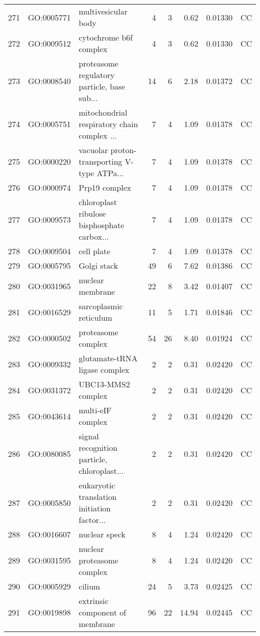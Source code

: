 \documentclass[12pt,oneside,a4paper]{article}
\begin{document}
\begin{longtable}{rllrrrll}
  271 & GO:0005771 & multivesicular body &   4 &   3 & 0.62 & 0.01330 & CC \\ 
  272 & GO:0009512 & cytochrome b6f complex &   4 &   3 & 0.62 & 0.01330 & CC \\ 
  273 & GO:0008540 & proteasome regulatory particle, base sub... &  14 &   6 & 2.18 & 0.01372 & CC \\ 
  274 & GO:0005751 & mitochondrial respiratory chain complex ... &   7 &   4 & 1.09 & 0.01378 & CC \\ 
  275 & GO:0000220 & vacuolar proton-transporting V-type ATPa... &   7 &   4 & 1.09 & 0.01378 & CC \\ 
  276 & GO:0000974 & Prp19 complex &   7 &   4 & 1.09 & 0.01378 & CC \\ 
  277 & GO:0009573 & chloroplast ribulose bisphosphate carbox... &   7 &   4 & 1.09 & 0.01378 & CC \\ 
  278 & GO:0009504 & cell plate &   7 &   4 & 1.09 & 0.01378 & CC \\ 
  279 & GO:0005795 & Golgi stack &  49 &   6 & 7.62 & 0.01386 & CC \\ 
  280 & GO:0031965 & nuclear membrane &  22 &   8 & 3.42 & 0.01407 & CC \\ 
  281 & GO:0016529 & sarcoplasmic reticulum &  11 &   5 & 1.71 & 0.01846 & CC \\ 
  282 & GO:0000502 & proteasome complex &  54 &  26 & 8.40 & 0.01924 & CC \\ 
  283 & GO:0009332 & glutamate-tRNA ligase complex &   2 &   2 & 0.31 & 0.02420 & CC \\ 
  284 & GO:0031372 & UBC13-MMS2 complex &   2 &   2 & 0.31 & 0.02420 & CC \\ 
  285 & GO:0043614 & multi-eIF complex &   2 &   2 & 0.31 & 0.02420 & CC \\ 
  286 & GO:0080085 & signal recognition particle, chloroplast... &   2 &   2 & 0.31 & 0.02420 & CC \\ 
  287 & GO:0005850 & eukaryotic translation initiation factor... &   2 &   2 & 0.31 & 0.02420 & CC \\ 
  288 & GO:0016607 & nuclear speck &   8 &   4 & 1.24 & 0.02420 & CC \\ 
  289 & GO:0031595 & nuclear proteasome complex &   8 &   4 & 1.24 & 0.02420 & CC \\ 
  290 & GO:0005929 & cilium &  24 &   5 & 3.73 & 0.02425 & CC \\ 
  291 & GO:0019898 & extrinsic component of membrane &  96 &  22 & 14.94 & 0.02445 & CC \\ 

\end{longtable}
\end{document}
